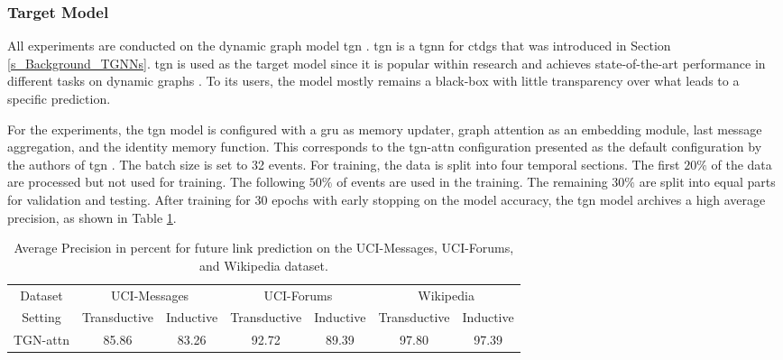 \subsubsection{Target Model}
\label{s_Evaluation_Setup_TargetModel}

All experiments are conducted on the dynamic graph model \gls{tgn} \cite{rossi_temporal_2020}. \gls{tgn} is a \gls{tgnn} for \glspl{ctdg} that was introduced in Section \ref{s_Background_TGNNs}. \gls{tgn} is used as the target model since it is popular within research \cite{souza_provably_2022} and achieves state-of-the-art performance in different tasks on dynamic graphs \cite{rossi_temporal_2020, souza_provably_2022}. To its users, the model mostly remains a black-box with little transparency over what leads to a specific prediction.

For the experiments, the \gls{tgn} model is configured with a \gls{gru} as memory updater, graph attention as an embedding module, last message aggregation, and the identity memory function. This corresponds to the \gls{tgn}-attn configuration presented as the default configuration by the authors of \gls{tgn} \cite{rossi_temporal_2020}. The batch size is set to 32 events. For training, the data is split into four temporal sections. The first $20\%$ of the data are processed but not used for training. The following $50\%$ of events are used in the training. The remaining $30\%$ are split into equal parts for validation and testing. After training for $30$ epochs with early stopping on the model accuracy, the \gls{tgn} model archives a high average precision, as shown in Table \ref{t_TGNTrainingPerformance}.

\begin{table}[ht]
    \small
    \centering
    \begin{tabular}{ccccccc}
    \hline
         Dataset &  \multicolumn{2}{c}{UCI-Messages} & \multicolumn{2}{c}{UCI-Forums}&  \multicolumn{2}{c}{Wikipedia}\\
         Setting &  Transductive&  Inductive & Transductive&  Inductive&  Transductive& Inductive\\
    \hline
         TGN-attn& 85.86 & 83.26 & 92.72&  89.39&  97.80& 97.39\\
    \hline
    \end{tabular}
    \caption{Average Precision in percent for future link prediction on the UCI-Messages, UCI-Forums, and Wikipedia dataset.}
    \label{t_TGNTrainingPerformance}
\end{table}

